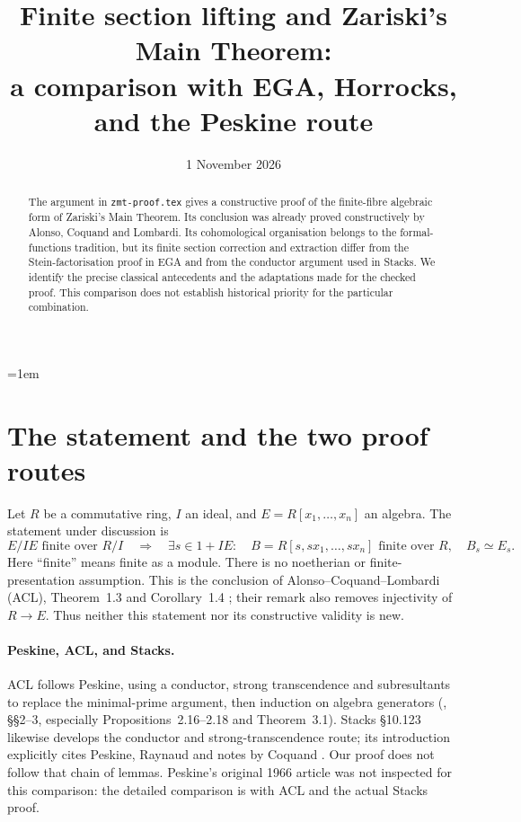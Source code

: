 \documentclass[11pt]{amsart}
\title[Comparing proofs of Zariski's Main Theorem]{Finite section lifting and Zariski's Main Theorem:\\
a comparison with EGA, Horrocks, and the Peskine route}
\date{1 November 2026}
\newcommand{\code}[1]{\texttt{#1}}
\begin{document}
\emergencystretch=1em
\begin{abstract}
The argument in \code{zmt-proof.tex} gives a constructive proof of the
finite-fibre algebraic form of Zariski's Main Theorem. Its conclusion
was already proved constructively by Alonso, Coquand and Lombardi.
Its cohomological organisation belongs to the formal-functions tradition,
but its finite section correction and extraction differ from the
Stein-factorisation proof in EGA and from the conductor argument used in
Stacks. We identify the precise classical antecedents and the adaptations
made for the checked proof. This comparison does not establish historical
priority for the particular combination.
\end{abstract}
\maketitle

\section{The statement and the two proof routes}

Let $R$ be a commutative ring, $I$ an ideal, and $E=R[x_1,\ldots,x_n]$
an algebra. The statement under discussion is
\[
 E/IE\text{ finite over }R/I
 \quad\Longrightarrow\quad
 \exists s\in1+IE:\quad
 B=R[s,sx_1,\ldots,sx_n]\text{ finite over }R,\quad B_s\simeq E_s.
\]
Here ``finite'' means finite as a module. There is no noetherian or
finite-presentation assumption. This is the conclusion of
Alonso--Coquand--Lombardi (ACL), Theorem~1.3 and Corollary~1.4
\cite{ACL}; their remark also removes injectivity of $R\to E$.
Thus neither this statement nor its constructive validity is new.

\paragraph{Peskine, ACL, and Stacks.}
ACL follows Peskine, using a conductor, strong transcendence and
subresultants to replace the minimal-prime argument, then induction on
algebra generators (\cite{ACL}, \S\S2--3, especially
Propositions~2.16--2.18 and Theorem~3.1).
Stacks \S10.123 likewise develops the conductor and strong-transcendence
route; its introduction explicitly cites Peskine, Raynaud and notes by
Coquand \cite{StacksZMT}. Our proof does not follow that chain of lemmas.
Peskine's original 1966 article was not inspected for this comparison:
the detailed comparison is with ACL and the actual Stacks proof.
\end{document}
